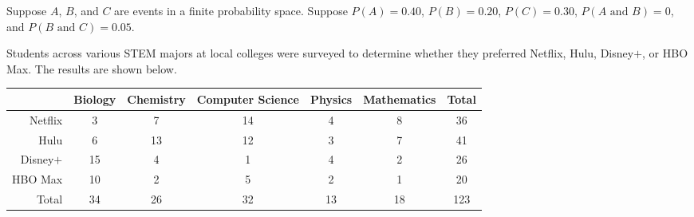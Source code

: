 \documentclass[12pt,letterpaper]{exam}
\begin{document}
\begin{questions}
\newpage
\question Suppose $A$, $B$, and $C$ are events in a finite probability space. Suppose $P(A)= 0.40$, $P(B)= 0.20$, $P(C)= 0.30$, $P(A \text{ and } B)= 0$, and $P(B \text{ and } C)= 0.05$. \pspace




\newpage
\question Students across various STEM majors at local colleges were surveyed to determine whether they preferred Netflix, Hulu, Disney$+$, or HBO Max. The results are shown below.
	\begin{table}[!ht]
	\centering
	\begin{tabular}{|r||c|c|c|c|c||c|} \hline
	& Biology & Chemistry & Computer Science & Physics & Mathematics & Total \\ \hline\hline
	Netflix & 3 & 7 & 14 & 4 & 8 & 36 \\ \hline
	Hulu & 6 & 13 & 12 & 3 & 7 & 41 \\ \hline
	Disney$+$ & 15 & 4 & 1 & 4 & 2 & 26 \\ \hline
	HBO Max & 10 & 2 & 5 & 2 & 1 & 20 \\ \hline\hline
	Total & 34 & 26 & 32 & 13 & 18 & 123 \\ \hline
	\end{tabular}
	\end{table}


\end{questions}
\end{document}
